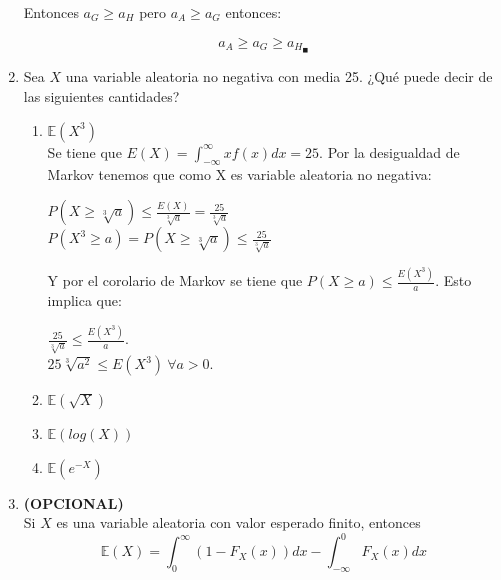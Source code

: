 \documentclass[12pt,a4paper]{report}
\begin{document}
\begin{enumerate}
{\begin{center}
		      \end{center}
		      Entonces $a_{G}\geq a_{H}$ pero $a_{A}\geq a_{G}$ entonces:\\
		      \begin{center}
		          $$a_{A}\geq a_{G} \geq a_{H}_{\blacksquare}$$
		      \end{center}
		      
 		}

		\item{
			Sea $X$ una variable aleatoria no negativa con media 25. ¿Qué puede
			decir de las siguientes cantidades?
			\begin{enumerate}
				\item {
					$\mathbb{E}(X^3)$ \\
					Se tiene que $E(X)= \int_{-\infty}^{\infty}xf(x) dx = 25$. Por la desigualdad de Markov tenemos que como X es variable aleatoria no negativa:\\
					\begin{center}
					    $P(X\geq \sqrt[3]{a})\leq \frac{E(X)}{\sqrt[3]{a}}=\frac{25}{\sqrt[3]{a}}$\\ 
					    $P(X^3\geq a)=P(X\geq \sqrt[3]{a})\leq \frac{25}{\sqrt[3]{a}}$
					\end{center}
					Y por el corolario de Markov se tiene que $P(X\geq a)\leq \frac{E(X^3)}{a}$. Esto implica que:\\
					\begin{center}
					    $\frac{25}{\sqrt[3]{a}}\leq \frac{E(X^3)}{a}.$\\
					    $25\sqrt[3]{a^2}\leq E(X^3) \ \forall a>0.$
					\end{center}
				}

				\item {
					$\mathbb{E}(\sqrt{X})$
				}

				\item {
					$\mathbb{E}(log(X))$
				}

				\item {
					$\mathbb{E}(e^{-X})$
				}
			\end{enumerate}
		}

		\item{
			\textbf{(OPCIONAL)}\\
			Si $X$ es una variable aleatoria con valor esperado finito,
			entonces
			\[\mathbb{E}(X) = \int_{0}^{\infty}{(1-F_X(x))dx} -
			\int_{-\infty}^{0}{F_X(x)dx}\]
		}

	\end{enumerate}
\end{document}
